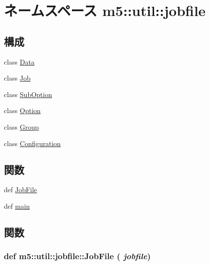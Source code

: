 \hypertarget{namespacem5_1_1util_1_1jobfile}{
\section{ネームスペース m5::util::jobfile}
\label{namespacem5_1_1util_1_1jobfile}
}
\subsection*{構成}
\begin{DoxyCompactItemize}
\item 
class \hyperlink{classm5_1_1util_1_1jobfile_1_1Data}{Data}
\item 
class \hyperlink{classm5_1_1util_1_1jobfile_1_1Job}{Job}
\item 
class \hyperlink{classm5_1_1util_1_1jobfile_1_1SubOption}{SubOption}
\item 
class \hyperlink{classm5_1_1util_1_1jobfile_1_1Option}{Option}
\item 
class \hyperlink{classm5_1_1util_1_1jobfile_1_1Group}{Group}
\item 
class \hyperlink{classm5_1_1util_1_1jobfile_1_1Configuration}{Configuration}
\end{DoxyCompactItemize}
\subsection*{関数}
\begin{DoxyCompactItemize}
\item 
def \hyperlink{namespacem5_1_1util_1_1jobfile_ae8f2a0dc1fd012076a0ee988ca30b66b}{JobFile}
\item 
def \hyperlink{namespacem5_1_1util_1_1jobfile_a7d9eae5b1acb133336d9466913bc9b2f}{main}
\end{DoxyCompactItemize}


\subsection{関数}
\hypertarget{namespacem5_1_1util_1_1jobfile_ae8f2a0dc1fd012076a0ee988ca30b66b}{
\subsubsection[{JobFile}]{\setlength{\rightskip}{0pt plus 5cm}def m5::util::jobfile::JobFile ( {\em jobfile})}}
\label{namespacem5_1_1util_1_1jobfile_ae8f2a0dc1fd012076a0ee988ca30b66b}



